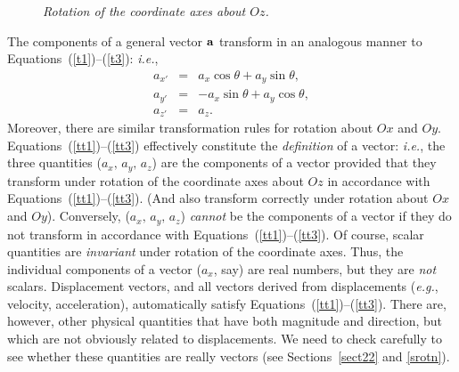 \begin{figure}
\epsfysize=1.75in
\centerline{}
\caption{\em Rotation of the coordinate axes about $Oz$.}\label{f3}
\end{figure}

The 
components of a general vector ${\bf a}$  transform in an analogous
manner to Equations~(\ref{t1})--(\ref{t3}): {\em i.e.}, 
\begin{eqnarray}
a_{x'} &=& a_x\cos\theta + a_y\sin \theta,\label{tt1}\\[0.5ex]
a_{y'} &=& -a_x\sin\theta + a_y\cos\theta,\\[0.5ex]
a_{z'} &=& a_z.\label{tt3}
\end{eqnarray}
Moreover, there are similar transformation rules for rotation about $Ox$ and $Oy$.
Equations~(\ref{tt1})--(\ref{tt3}) effectively constitute the {\em definition}\/ of a vector: {\em i.e.}, 
 the three
quantities ($a_x,\, a_y,\, a_z$) are the components of a vector provided that
they transform under rotation of the coordinate axes about $Oz$ in accordance with Equations~(\ref{tt1})--(\ref{tt3}). (And also transform
correctly under rotation about $Ox$ and $Oy$).
Conversely, ($a_x,\, a_y,\, a_z$) {\em cannot}\/ be the components of a vector if they
do not transform in accordance with Equations~(\ref{tt1})--(\ref{tt3}). Of course, scalar quantities are {\em invariant}\/
 under rotation of the coordinate axes.
Thus, the individual components of a vector ($a_x$, say) are real numbers, but 
they are
{\em not}\/ scalars.
Displacement vectors, and all vectors derived from
displacements ({\em e.g.}, velocity, acceleration), automatically satisfy Equations~(\ref{tt1})--(\ref{tt3}). There are, however, other
physical quantities that  have both magnitude and direction, but which are not
obviously related to displacements. We need to check carefully to see whether these
quantities are really vectors (see Sections~\ref{sect22} and \ref{srotn}). 


